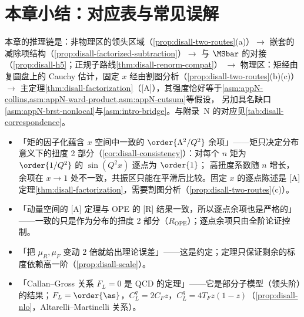 \section{本章小结：对应表与常见误解}\label{sec:disall-summary}

本章的推理链是：非物理区的领头区域（\cref{prop:disall-two-routes}(a)）$\to$ 嵌套的减除项结构（\cref{prop:disall-factorized-subtraction}）$\to$ 与 $\MSbar$ 的对接（\cref{prop:disall-h5}；正规子路线\cref{thm:disall-renorm-compat}）
$\to$ 物理区：矩经由复圆盘上的 Cauchy 估计，固定 $x$ 经由割图分析（\cref{prop:disall-two-routes}(b)(c)）$\to$ 主定理\cref{thm:disall-factorization}（[A]），其强度恰好等于\cref{asm:appN-collins,asm:appN-ward-product,asm:appN-cutsum}等假设，
另加具名缺口\cref{asm:appN-brst-nonlocal}与\cref{asm:intro-bridge}。与附录~N 的对应见\cref{tab:disall-correspondence}。

\begin{tcolorbox}[enhanced,breakable,title=本章涉及的常见误解,fonttitle=\bfseries,
  colback=gray!3!white,colframe=gray!55!black,boxrule=0.6pt,arc=2pt,
  left=5pt,right=5pt,top=3pt,bottom=3pt,before skip=6pt,after skip=6pt]
\begin{itemize}[leftmargin=1.2em,itemsep=1pt,topsep=1pt]
\item 「矩的因子化蕴含 $x$ 空间中一致的 $\order{\Lambda^2/Q^2}$ 余项」——矩只决定分布意义下的扭度 2 部分（\cref{cor:disall-consistency}）：对每个 $n$ 矩为 $\order{1/Q^2}$ 的 $\sin(Q^2x)$ 逐点为 $\order{1}$；
高扭度系数随 $n$ 增长，余项在 $x\to1$ 处不一致，共振区只能在平滑后比较。固定 $x$ 的逐点陈述是 [A] 定理\cref{thm:disall-factorization}，需要割图分析（\cref{prop:disall-two-routes}(c)）。
\item 「动量空间的 [A] 定理与 OPE 的 [R] 结果一致，所以逐点余项也是严格的」——一致的只是作为分布的扭度 2 部分（$R_{\mathrm{OPE}}$）；逐点余项只由全阶论证控制。
\item 「把 $\mu_R,\mu_F$ 变动 $2$ 倍就给出理论误差」——这是约定；定理只保证剩余的标度依赖高一阶（\cref{prop:disall-scale}）。
\item 「Callan--Gross 关系 $F_L=0$ 是 QCD 的定理」——它是部分子模型（领头阶）的结果；$F_L=\order{\as}$，$C_L^q=2C_Fz$，$C_L^g=4T_Fz(1-z)$（\cref{prop:disall-nlo}，Altarelli--Martinelli 关系）。
\end{itemize}
\end{tcolorbox}

